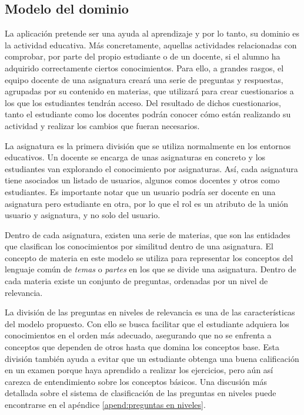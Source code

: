 \subsection{Modelo del dominio}

La aplicación pretende ser una ayuda al aprendizaje y por lo tanto, su dominio es la actividad educativa. Más concretamente, aquellas actividades relacionadas con comprobar, por parte del propio estudiante o de un docente, si el alumno ha adquirido correctamente ciertos conocimientos. Para ello, a grandes rasgos, el equipo docente de una asignatura creará una serie de preguntas y respuestas, agrupadas por su contenido en materias, que utilizará para crear cuestionarios a los que los estudiantes tendrán acceso. Del resultado de dichos cuestionarios, tanto el estudiante como los docentes podrán conocer cómo están realizando su actividad y realizar los cambios que fueran necesarios.

La asignatura es la primera división que se utiliza normalmente en los entornos educativos. Un docente se encarga de unas asignaturas en concreto y los estudiantes van explorando el conocimiento por asignaturas. Así, cada asignatura tiene asociados un listado de usuarios, algunos comos docentes y otros como estudiantes. Es importante notar que un usuario podría ser docente en una asignatura pero estudiante en otra, por lo que el rol es un atributo de la unión usuario y asignatura, y no solo del usuario.

Dentro de cada asignatura, existen una serie de materias, que son las entidades que clasifican los conocimientos por similitud dentro de una asignatura. El concepto de materia en este modelo se utiliza para representar los conceptos del lenguaje común de \emph{temas} o \emph{partes} en los que se divide una asignatura. Dentro de cada materia existe un conjunto de preguntas, ordenadas por un nivel de relevancia.

La división de las preguntas en niveles de relevancia es una de las características del modelo propuesto. Con ello se busca facilitar que el estudiante adquiera los conocimientos en el orden más adecuado, asegurando que no se enfrenta a conceptos que dependen de otros hasta que domina los conceptos base. Esta división también ayuda a evitar que un estudiante obtenga una buena calificación en un examen porque haya aprendido a realizar los ejercicios, pero aún así carezca de entendimiento sobre los conceptos básicos. Una discusión más detallada sobre el sistema de clasificación de las preguntas en niveles puede encontrarse en el apéndice \ref{apend:preguntas en niveles}.

